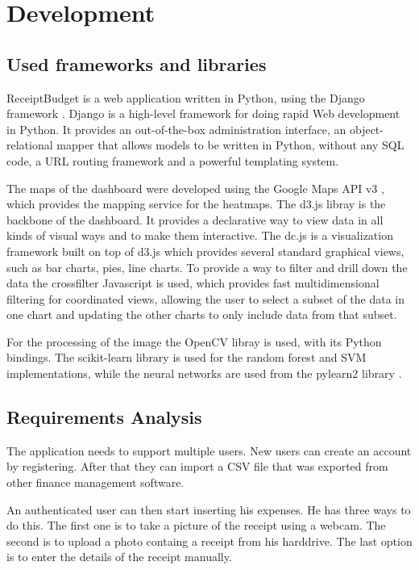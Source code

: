 \section{Development}

\subsection{Used frameworks and libraries}
ReceiptBudget is a web application written in Python, using the Django framework  \cite{django}. Django is a high-level framework for doing rapid Web development in Python. It provides an out-of-the-box administration interface, an object-relational mapper that allows models to be written in Python, without any SQL code, a URL routing framework and a powerful templating system.

The maps of the dashboard were developed using the Google Maps API v3 \cite{gmapsjs}, which provides the mapping service for the heatmaps. The d3.js libray \cite{bostock2011d3} is the backbone of the dashboard. It provides a declarative way to view data in all kinds of visual ways and to make them interactive. The dc.js is a visualization framework built on top of d3.js which provides several standard graphical views, such as bar charts, pies, line charts. To provide a way to filter and drill down the data the crossfilter Javascript is used, which provides fast multidimensional filtering for coordinated views, allowing the user to select a subset of the data in one chart and updating the other charts to only include data from that subset. 

For the processing of the image the OpenCV libray is used, with its Python bindings. The scikit-learn library \cite{pedregosa2011scikit} is used for the random forest and SVM implementations, while the neural networks are used from the pylearn2 library \cite{goodfellow2013pylearn2}. 
\subsection{Requirements Analysis}
The application needs to support multiple users. New users can create an account by registering. After that they can import a CSV file that was exported from other finance management software. 

An authenticated user can then start inserting his expenses. He has three ways to do this. The first one is to take a picture of the receipt using a webcam. The second is to upload a photo containg a receipt from his harddrive. The last option is to enter the details of the receipt manually. 

